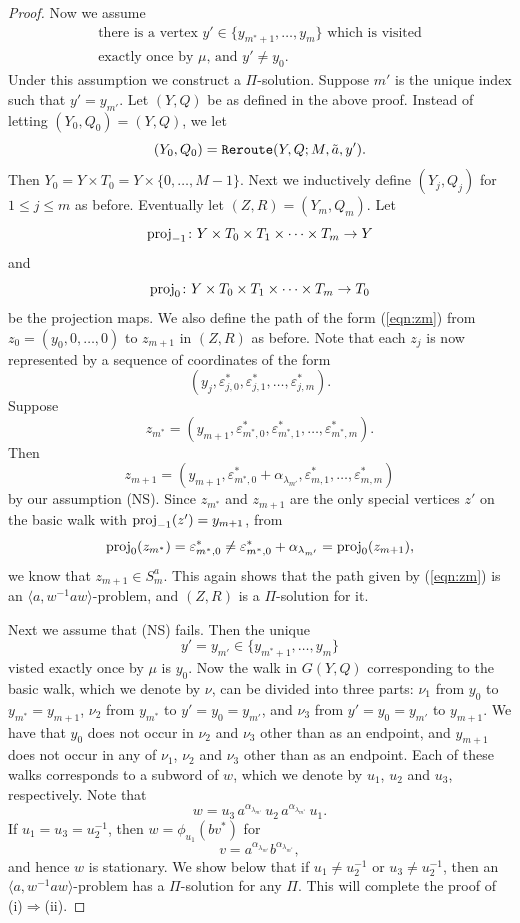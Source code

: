 \documentclass[10pt,a4paper]{amsart}
\theoremstyle{definition}
\theoremstyle{definition}
\numberwithin{equation}{section}
\begin{document}
\begin{proof}
Now we assume
\begin{equation}\label{NS} \tag{NS} \begin{array}{l} \mbox{there is a vertex $y'\in\{y_{m^*+1}, \dots, y_m\}$ which is visited} \\
\mbox{exactly once by $\mu$, and $y'\neq y_0$.}\end{array}
\end{equation}
Under this assumption we construct a $\Pi$-solution. Suppose $m'$ is the unique index such that $y'=y_{m'}$. Let $(Y, Q)$ be as defined in the above proof. Instead of letting $(Y_0, Q_0)=(Y, Q)$, we let
$$ (Y_0, Q_0)=\mbox{\tt Reroute}(Y, Q; M, \tilde{a}, y'). $$
Then $Y_0=Y\times T_0=Y\times \{0, \dots, M-1\}$. Next we inductively define $(Y_j, Q_j)$ for $1\leq j\leq m$ as before. Eventually let $(Z, R)=(Y_m, Q_m)$. Let
$$ \mbox{\rm proj}_{-1}\colon Y\times T_0\times T_1\times \cdots \times T_m\to Y $$
and $$\mbox{\rm proj}_0\colon Y\times T_0\times T_1\times \cdots \times T_m\to T_0 $$
be the projection maps. We also define the path of the form (\ref{eqn:zm}) from $z_0=(y_0, 0, \dots, 0)$ to $z_{m+1}$ in $(Z, R)$ as before. Note that each $z_j$ is now represented by a sequence of coordinates of the form
\begin{equation}\label{eqn:zjcoordinatesnew} (y_j, \varepsilon^*_{j,0}, \varepsilon^*_{j, 1},\dots, \varepsilon^*_{j, m}).
\end{equation}
Suppose 
$$  z_{m^*}=(y_{m+1}, \varepsilon^*_{m^*,0}, \varepsilon^*_{m^*, 1},\dots, \varepsilon^*_{m^*, m}). $$
Then
$$ z_{m+1}=(y_{m+1}, \varepsilon^*_{m^*,0}+\alpha_{\lambda_{m'}}, \varepsilon^*_{m, 1}, \dots, \varepsilon^*_{m, m}) $$
by our assumption (NS). Since $z_{m^*}$ and $z_{m+1}$ are the only special vertices $z'$ on the basic walk with $\mbox{\rm proj}_{-1}(z')=y_{m+1}$, from 
$$ \mbox{\rm proj}_0(z_{m^*})=\varepsilon^*_{m^*, 0}\neq \varepsilon^*_{m^*,0}+\alpha_{\lambda_{m'}}=\mbox{\rm proj}_0(z_{m+1}), $$
we know that $z_{m+1}\in S_m^a$. This again shows that the path given by (\ref{eqn:zm}) is an $\langle a, w^{-1}aw\rangle$-problem, and $(Z, R)$ is a $\Pi$-solution for it.

Next we assume that (NS) fails. Then the unique 
$$y'=y_{m'}\in\{y_{m^*+1}, \dots, y_m\}$$ visted exactly once by $\mu$ is $y_0$. Now the walk in $G(Y, Q)$ corresponding to the basic walk, which we denote by $\nu$, can be divided into three parts: $\nu_1$ from $y_0$ to $y_{m^*}=y_{m+1}$, $\nu_2$ from $y_{m^*}$ to $y'=y_0=y_{m'}$, and $\nu_3$ from $y'=y_0=y_{m'}$ to $y_{m+1}$. We have that $y_0$ does not occur in $\nu_2$ and $\nu_3$ other than as an endpoint, and $y_{m+1}$ does not occur in any of $\nu_1$, $\nu_2$ and $\nu_3$ other than as an endpoint. Each of these walks corresponds to a subword of $w$, which we denote by $u_1$, $u_2$ and $u_3$, respectively. Note that 
$$ w=u_3\, a^{\alpha_{\lambda_{m'}}}\, u_2\, a^{\alpha_{\lambda_{m^*}}}\,  u_1. $$
If $u_1=u_3=u_2^{-1}$, then $w=\phi_{u_1}(bv^*)$ for 
$$ v=a^{\alpha_{\lambda_{m'}}} b^{\alpha_{\lambda_{m^*}}}, $$
and hence $w$ is stationary. We show below that if $u_1\neq u_2^{-1}$ or $u_3\neq u_2^{-1}$, then an $\langle a, w^{-1}aw\rangle$-problem has a $\Pi$-solution for any $\Pi$. This will complete the proof of (i)$\Rightarrow$(ii). 


\end{proof}
\end{document}
